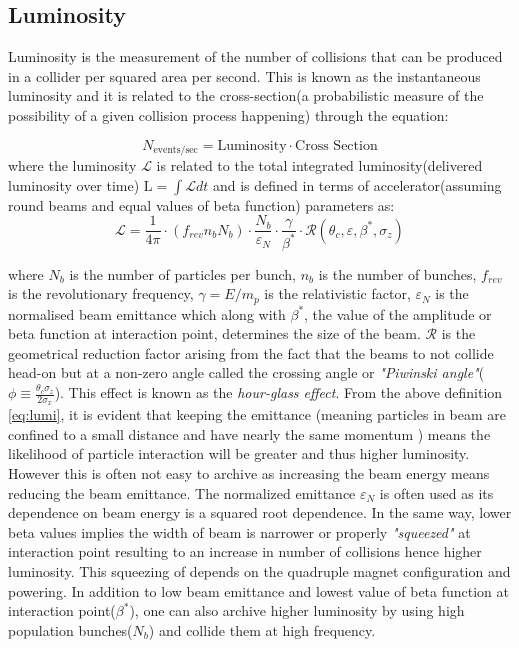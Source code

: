 \subsection{Luminosity}
Luminosity is the measurement of the number of collisions that can be produced in a collider per squared area per second. This is known as the instantaneous luminosity and it is related to the cross-section(a probabilistic measure of the possibility of a given collision process happening) through the equation:

\begin{equation}
N_{\mbox{events/sec}} = \mbox{Luminosity} \cdot \mbox{Cross Section}
\end{equation}
where the luminosity $\mathscr{L}$ is related to the total integrated luminosity(delivered luminosity over time) $\mathrm{L} = \int \mathscr{L}dt$ and is defined in terms of accelerator(assuming round beams and equal values of beta function) parameters as:
\begin{equation}\label{eq:lumi}
\mathscr{L} = \frac{1}{4\pi}\cdot\left(f_{rev}\mathit{n}_{b}\mathit{N}_{b}\right)\cdot\frac{\mathit{N}_{b}}{\varepsilon_{N}}\cdot \frac{\gamma}{\beta^{\ast}}\cdot \mathscr{R}(\theta_{c},\varepsilon,\beta^{\ast},\sigma_{z} )
\end{equation}

where $\mathit{N}_{b}$ is the number of particles per bunch, $\mathit{n}_{b}$ is the number of bunches, $f_{rev}$ is the revolutionary frequency, $\gamma = E/m_{p}$ is the relativistic factor, $\varepsilon_{N}$ is the normalised beam emittance which along with $\beta^{\ast}$, the value of the amplitude or beta function at interaction point, determines the size of the beam. $\mathscr{R}$ is the geometrical reduction factor arising from the fact that the beams to not collide head-on but at a non-zero angle called the crossing angle or \textit{"Piwinski angle"}( $\phi \equiv \frac{\theta_{c}\sigma_{z}}{2\sigma_{x}}$). This effect is known as the \textit{hour-glass effect}.
From the above definition \ref{eq:lumi}, it is evident that keeping the emittance (meaning particles in beam are confined to a small distance and have nearly the same momentum ) means the likelihood of particle interaction will be greater and thus higher luminosity. However this is often not easy to archive as increasing the beam energy means reducing the beam emittance. The normalized emittance $\varepsilon_{N}$ is often used as its dependence on beam energy is a squared root dependence.
In the same way, lower beta values implies the width of beam is narrower or properly \textit{"squeezed"} at interaction point resulting to an increase in number of collisions hence higher luminosity.
This squeezing of depends on the quadruple magnet configuration and powering. 
In addition to low beam emittance and lowest value of beta function at interaction point($\beta^{\ast}$), one can also archive higher luminosity by using high population bunches($\mathit{N}_{b}$) and collide them at high frequency.

